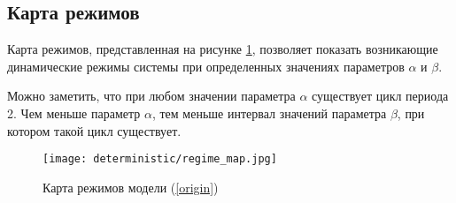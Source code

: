     \subsection{Карта режимов}

        Карта режимов, представленная на рисунке \ref{regimeMap}, позволяет показать возникающие динамические режимы системы при определенных значениях параметров \(\alpha\) и \(\beta\).

        Можно заметить, что при любом значении параметра \(\alpha\) существует цикл периода  2. Чем меньше параметр \(\alpha\), тем меньше интервал значений параметра \(\beta\), при котором такой цикл существует.

        \begin{figure}
            \centering
            \texttt{[image: deterministic/regime\_map.jpg]}

            \captionsetup{justification=centering}
            \caption{Карта режимов модели (\ref{origin})}
            \label{regimeMap}
        \end{figure}
